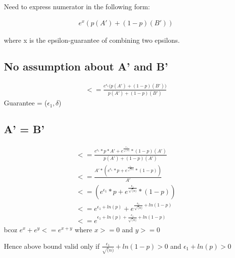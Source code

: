 Need to express numerator in the following form:

\begin{gather*}
e^{x}({p(A') + (1-p)(B')})
\end{gather*}

where x is the epsilon-guarantee of combining two epsilons.

\subsection{No assumption about A' and B'}
\begin{gather*}
<=\frac{e^{\epsilon_{1}}({p(A') + (1-p)(B'))}}{p(A') + (1-p)(B')} 
\end{gather*}
Guarantee = ($\epsilon_{1}, \delta$)

\subsection{A' = B'}
\begin{gather*}
<=\frac{e^{\epsilon_{1}}*p*A' + e^{\frac{\epsilon_{1}}{\sqrt(n)}}*(1-p)(A')}{p(A') + (1-p)(A')}\\
<=\frac{A'*(e^{\epsilon_{1}}*p + e^{\frac{\epsilon_{1}}{\sqrt(n)}}*(1-p))}{A'}\\
<=(e^{\epsilon_{1}}*p + e^{\frac{\epsilon_{1}}{\sqrt(n)}}*(1-p))\\
<=e^{\epsilon_{1} + ln(p)} + e^{\frac{\epsilon_{1}}{\sqrt(n)}+ln(1-p)}\\
<=e^{\epsilon_{1} + ln(p) + \frac{\epsilon_{1}}{\sqrt(n)} + ln(1-p)} 
\end{gather*}
bcoz $e^x + e^y <= e^{x+y}$ where $x>=0$ and $y >=0$

Hence above bound valid only if $\frac{\epsilon_{1}}{\sqrt(n)} + ln(1-p) > 0$ and $\epsilon_{1} + ln(p) > 0$\\

